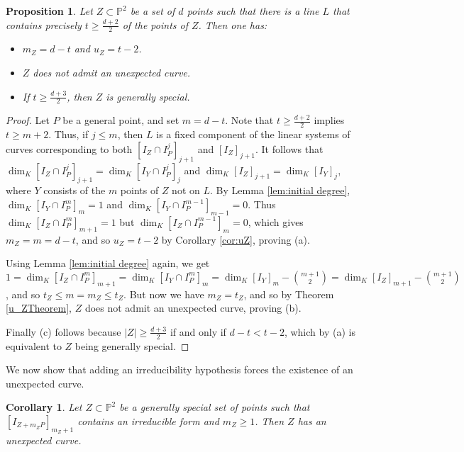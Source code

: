 \documentclass[12pt]{amsart}
\numberwithin{equation}{section}
\newtheorem{proposition}[theorem]{Proposition}
\newtheorem{corollary}[theorem]{Corollary}
\theoremstyle{definition}
\begin{document}
\begin{proposition}
   \label{prop:gen special not sufficient} 
Let  $Z \subset \mathbb P^2$ be a set of $d$ points such that there is a line $L$ that contains precisely $t \ge \frac{d+2}{2}$ of the points of  $Z$. Then one has: 
\begin{itemize}
\item[(a)] $m_Z = d - t$ and $u_Z = t-2$. 

\item[(b)] $Z$ does not admit an unexpected curve. 

\item[(c)] If $t \ge \frac{d+3}{2}$, then $Z$ is generally special. 
\end{itemize}   
\end{proposition}

\begin{proof}
Let $P$ be a general point, and set $m=d-t$. Note that $t\ge  \frac{d+2}{2}$ implies $t\geq m+2$. Thus, if  $j\le m$, then $L$ is a fixed component
of the linear systems of curves corresponding to both $[I_Z\cap I_P^j]_{j+1}$ and $[I_Z]_{j+1}$. It follows that  
 $\dim_K [I_Z\cap I_P^j]_{j+1}=\dim_K[I_Y\cap I_P^j]_j$ and $\dim_K[I_Z]_{j+1}=\dim_K[I_Y]_j$,
where $Y$ consists of the $m$ points of $Z$ not on $L$. By Lemma \ref{lem:initial degree},
$\dim_K[I_Y\cap I_P^m]_m=1$ and $\dim_K[I_Y\cap I_P^{m-1}]_{m-1}=0$.
Thus $\dim_K[I_Z\cap I_P^m]_{m+1} = 1$ but $\dim_K [I_Z\cap I_P^{m-1}]_m=0$, which gives $m_Z = m = d-t$, and so $u_Z = t-2$ by Corollary \ref{cor:uZ}, proving (a).  

Using Lemma \ref{lem:initial degree} again, we get 
$1=\dim_K [I_Z\cap I_P^m]_{m+1}=\dim_K [I_Y\cap I_P^m]_m=\dim_K [I_Y]_m-\binom{m+1}{2}=\dim_K [I_Z]_{m+1}-\binom{m+1}{2}$, and 
so $t_Z\leq m=m_Z\leq t_Z$. 
But now we have $m_Z = t_Z$, and so by Theorem \ref{u_ZTheorem}, $Z$ does not admit an unexpected curve, proving (b).

Finally (c) follows because $|Z| \ge \frac{d+3}{2}$ if and only if $d- t < t-2$, which by (a) is equivalent to  $Z$ being generally special. 
\end{proof} 

We now show that adding an irreducibility hypothesis forces the existence of an unexpected curve. 

\begin{corollary} 
   \label{cor:irr forces unexpected}
Let  $Z \subset \mathbb P^2$ be a generally special set of points such that  $[I_{Z+m_ZP}]_{m_Z+1}$ contains an irreducible form and $m_Z \ge 1$. Then $Z$ has an unexpected curve.
\end{corollary}
\end{document}
